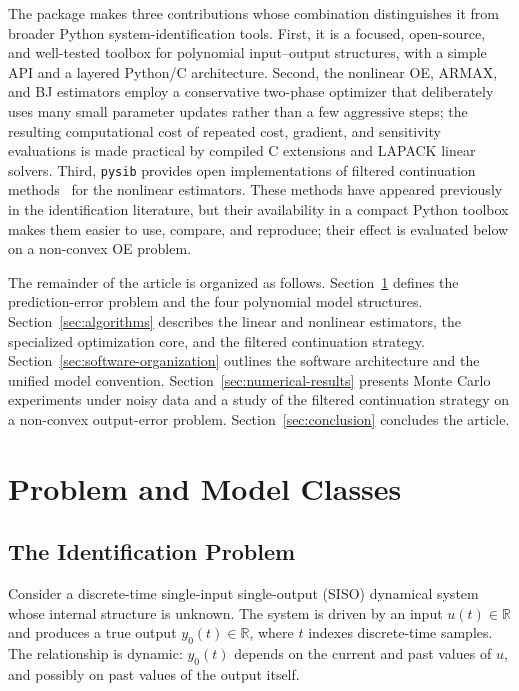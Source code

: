 \documentclass{ifacconf}
\begin{document}
The package makes three contributions whose combination distinguishes
it from broader Python system-identification tools.
First, it is a focused, open-source, and well-tested toolbox for
polynomial input--output structures, with a simple API and a layered
Python/C architecture.
Second, the nonlinear OE, ARMAX, and BJ estimators employ a
conservative two-phase optimizer that deliberately uses many small
parameter updates rather than a few aggressive steps; the resulting
computational cost of repeated cost, gradient, and sensitivity
evaluations is made practical by compiled C extensions and LAPACK
linear solvers.
Third, \texttt{pysib} provides open implementations of filtered
continuation methods~\cite{eckhard2013input,eckhard2017cost} for the
nonlinear estimators.  These methods have appeared previously in the
identification literature, but their availability in a compact Python
toolbox makes them easier to use, compare, and reproduce; their effect is
evaluated below on a non-convex OE problem.

The remainder of the article is organized as follows.
Section~\ref{sec:problem-model-classes} defines the prediction-error
problem and the four polynomial model structures.
Section~\ref{sec:algorithms} describes the linear and nonlinear
estimators, the specialized optimization core, and the filtered
continuation strategy.
Section~\ref{sec:software-organization} outlines the software
architecture and the unified model convention.
Section~\ref{sec:numerical-results} presents Monte Carlo experiments
under noisy data and a study of the filtered continuation strategy
on a non-convex output-error problem.
Section~\ref{sec:conclusion} concludes the article.

\section{Problem and Model Classes}
\label{sec:problem-model-classes}

\subsection{The Identification Problem}
\label{subsec:identification-problem}

Consider a discrete-time single-input single-output (SISO) dynamical system
whose internal structure is unknown.  The system is driven by an input
$u(t) \in \mathbb{R}$ and produces a true output $y_0(t) \in \mathbb{R}$,
where $t$ indexes discrete-time samples.  The relationship is dynamic:
$y_0(t)$ depends on the current and past values of $u$, and possibly on past
values of the output itself.
\end{document}
